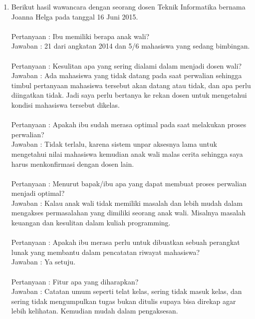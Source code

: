 \begin{enumerate}
\item Berikut hasil wawancara dengan seorang dosen Teknik Informatika bernama Joanna Helga pada tanggal 16 Juni 2015.\\\\
Pertanyaan : Ibu memiliki berapa anak wali?\\
Jawaban : 21 dari angkatan 2014 dan 5/6 mahasiswa yang sedang bimbingan.\\\\
Pertanyaan : Kesulitan apa yang sering dialami dalam menjadi dosen wali?\\
Jawaban : Ada mahasiswa yang tidak datang pada saat perwalian sehingga timbul pertanyaan mahasiswa tersebut akan datang atau tidak, dan apa perlu diingatkan tidak. Jadi saya perlu bertanya ke rekan dosen untuk mengetahui kondisi mahasiswa tersebut dikelas.\\\\
Pertanyaan : Apakah ibu sudah merasa optimal pada saat melakukan proses perwalian?\\
Jawaban : Tidak terlalu, karena sistem unpar aksesnya lama untuk mengetahui nilai mahasiswa kemudian anak wali malas cerita sehingga saya harus menkonfirmasi dengan dosen lain.\\\\
Pertanyaan : Menurut bapak/ibu apa yang dapat membuat proses perwalian menjadi optimal?\\
Jawaban : Kalau anak wali tidak memiliki masalah dan lebih mudah dalam mengakses permasalahan yang dimiliki seorang anak wali. Misalnya masalah keuangan dan kesulitan dalam kuliah programming.\\\\
Pertanyaan : Apakah ibu merasa perlu untuk dibuatkan sebuah perangkat lunak yang membantu dalam pencatatan riwayat mahasiswa?\\
Jawaban : Ya setuju.\\\\
Pertanyaan : Fitur apa yang diharapkan?\\
Jawaban : Catatan umum seperti telat kelas, sering tidak masuk kelas, dan sering tidak mengumpulkan tugas bukan ditulis supaya bisa direkap agar lebih kelihatan. Kemudian mudah dalam pengaksesan.\\


\end{enumerate}
